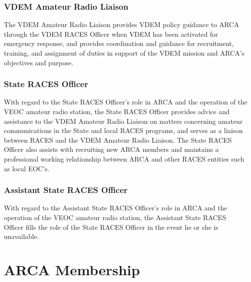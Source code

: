 \documentclass[pdflatex,letterpaper,twoside,12pt]{book}
\begin{document}
\subsection{VDEM Amateur Radio Liaison}

The VDEM Amateur Radio Liaison provides VDEM policy guidance to ARCA through the VDEM RACES Officer when VDEM has been activated for emergency response, and provides coordination and guidance for recruitment, training, and assignment of duties in support of the VDEM mission and ARCA's objectives and purpose.

\subsection{State RACES Officer}

With regard to the State RACES Officer's role in ARCA and the operation of the VEOC amateur radio station, the State RACES Officer provides advice and assistance to the VDEM Amateur Radio Liaison on matters concerning amateur communications in the State and local RACES programs, and serves as a liaison between RACES and the VDEM Amateur Radio Liaison.  The State RACES Officer also assists with recruiting new ARCA members and maintains a professional working relationship between ARCA and other RACES entities such as local EOC's.

\subsection{Assistant State RACES Officer}

With regard to the Assistant State RACES Officer's role in ARCA and the operation of the VEOC amateur radio station, the Assistant State RACES Officer fills the role of the State RACES Officer in the event he or she is unavailable.


\chapter{ARCA Membership}
\end{document}
